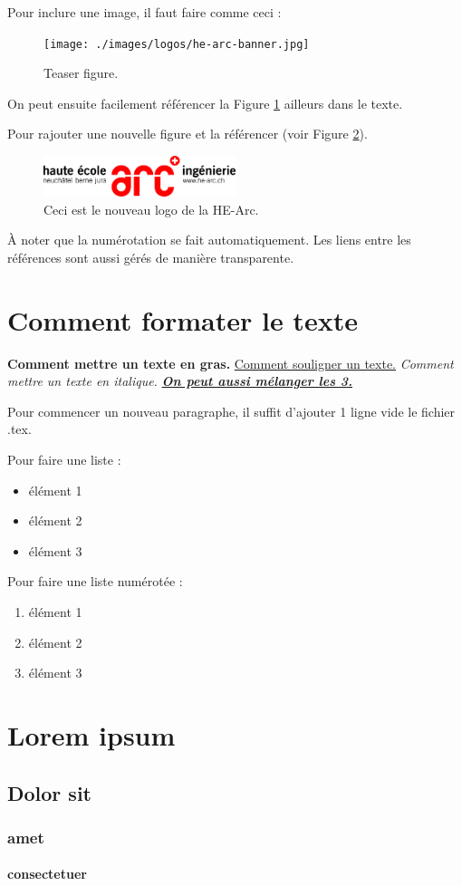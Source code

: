 Pour inclure une image, il faut faire comme ceci :
\begin{figure}[h]
  \centering
  \texttt{[image: ./images/logos/he-arc-banner.jpg]}
  \caption{Teaser figure.}
  \label{Fig_teaser}
\end{figure}

On peut ensuite facilement référencer la Figure \ref{Fig_teaser} ailleurs dans le texte.

Pour rajouter une nouvelle figure et la référencer (voir Figure \ref{Fig_exemple}).
\begin{figure}[h]
    \centering
    \includegraphics[width=0.5\textwidth]{./images/logos/he-arc-logo.png}
    \caption{Ceci est le nouveau logo de la HE-Arc.}
    \label{Fig_exemple}
\end{figure}

À noter que la numérotation se fait automatiquement.
Les liens entre les références sont aussi gérés de manière transparente.

\section{Comment formater le texte}
\textbf{Comment mettre un texte en gras.}
\underline{Comment souligner un texte.} 
\textit{Comment mettre un texte en italique.}
\underline{\textbf{\textit{On peut aussi mélanger les 3.}}}

Pour commencer un nouveau paragraphe, il suffit d'ajouter 1 ligne vide le fichier .tex.

Pour faire une liste :
\begin{itemize}
    \item élément 1
    \item élément 2
    \item élément 3
\end{itemize}

Pour faire une liste numérotée :
\begin{enumerate}
    \item élément 1
    \item élément 2
    \item élément 3
\end{enumerate}

\section{Lorem ipsum}
\lipsum[1-1] %
\subsection{Dolor sit}
\lipsum[1-1] %
\subsubsection{amet}
\lipsum[1-1] %
\paragraph{consectetuer}
\lipsum[1-1] %